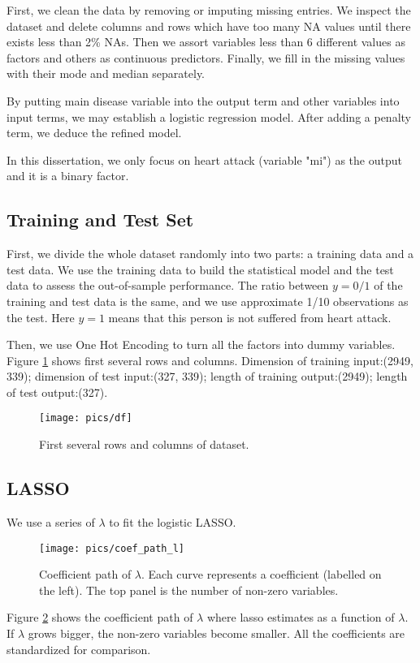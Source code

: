 \documentclass[]{article}
\begin{document}
First, we clean the data by removing or imputing missing entries. We inspect the dataset and delete columns and rows which have too many NA values until there exists less than 2\% NAs. Then we assort variables less than 6 different values as factors and others as continuous predictors. Finally, we fill in the missing values with their mode and median separately.

By putting main disease variable into the output term and other variables into input terms, we may establish a logistic regression model. After adding a penalty term, we deduce the refined model. 

In this dissertation, we only focus on heart attack (variable "mi") as the output and it is a binary factor.

\subsection{Training and Test Set}
First, we divide the whole dataset randomly into two parts: a training data and a test data. We use the training data
to build the statistical model and the test data to assess the out-of-sample performance. The ratio between $ y=0/1 $ of the training and test data is the same, and we use approximate 1/10 observations as the test. Here $y=1$ means that this person is not suffered from heart attack.

Then, we use One Hot Encoding to turn all the factors into dummy variables. Figure \ref{fig=df} shows first several rows and columns.  Dimension of training input:(2949, 339); dimension of test input:(327, 339); length of training output:(2949); length of test output:(327).

\begin{figure}[H]
	\centering
	\texttt{[image: pics/df]}
	\caption{First several rows and columns of dataset.\label{fig=df}}
\end{figure}

\subsection{LASSO}
We use a series of $\lambda$ to fit the logistic LASSO.
\begin{figure}[H]
	\centering
	\texttt{[image: pics/coef\_path\_l]}
	\caption{Coefficient path of $ \lambda $. Each curve represents a coefficient (labelled on the left). The top panel is the number of non-zero variables.\label{fig=cpl}}
\end{figure}
Figure \ref{fig=cpl} shows the coefficient path of $ \lambda $ where lasso estimates as a function of $ \lambda $. If $ \lambda $ grows bigger, the non-zero variables become smaller. All the coefficients are standardized for comparison.
\end{document}
